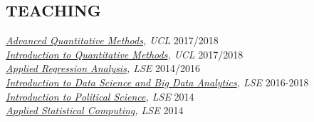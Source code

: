 \documentclass[centered]{res}
\begin{document}
\begin{resume}
\section{TEACHING} 	
{\sl\href{https://uclspp.github.io/PUBLG088/}{Advanced Quantitative Methods}, UCL} \hfill 2017/2018 \\
{\sl\href{http://uclspp.github.io/PUBLG100/}{Introduction to Quantitative Methods}, UCL} \hfill 2017/2018 \\
{\sl\href{http://www.lse.ac.uk/resources/calendar/courseGuides/MY/2014_MY452.htm}{Applied Regression Analysis}, LSE} \hfill 2014/2016 \\
{\sl\href{http://www.lse.ac.uk/study/summerSchools/Methods/Mathematics-&-Statistics/ME114.aspx}{Introduction to Data Science and Big Data Analytics}, LSE} \hfill 2016-2018 \\
{\sl\href{http://www.lse.ac.uk/resources/calendar/courseGuides/GV/2015_GV101.htm}{Introduction to Political Science}, LSE} \hfill 2014 \\	
{\sl\href{http://www.lse.ac.uk/resources/calendar/courseGuides/MY/2014_MY459.htm}{Applied Statistical Computing}, LSE} \hfill 2014 	

%
%
                 

\end{resume}
\end{document}
